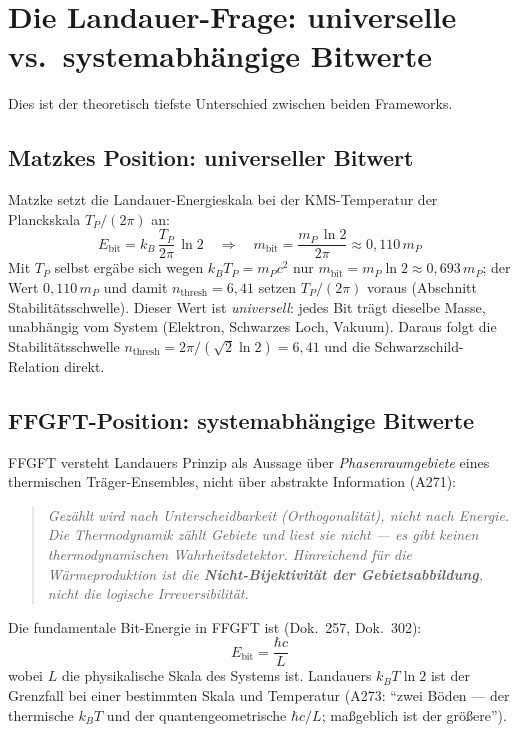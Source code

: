 \section{Die Landauer-Frage: universelle vs.\ systemabhängige Bitwerte}

Dies ist der theoretisch tiefste Unterschied zwischen beiden Frameworks.

\subsection{Matzkes Position: universeller Bitwert}

Matzke setzt die Landauer-Energieskala bei der KMS-Temperatur der Planckskala $T_P/(2\pi)$ an:
\begin{equation}
  E_{\mathrm{bit}} = k_B\,\frac{T_P}{2\pi}\,\ln 2 \quad\Rightarrow\quad
  m_{\mathrm{bit}} = \frac{m_P\,\ln 2}{2\pi} \approx 0{,}110\,m_P
  \tag{Matzke, Kap.\ 6}
\end{equation}
Mit $T_P$ selbst ergäbe sich wegen $k_BT_P = m_Pc^2$ nur
$m_{\mathrm{bit}} = m_P\ln 2 \approx 0{,}693\,m_P$; der Wert $0{,}110\,m_P$ und
damit $n_{\mathrm{thresh}} = 6{,}41$ setzen $T_P/(2\pi)$ voraus (Abschnitt Stabilitätsschwelle).
Dieser Wert ist \emph{universell}: jedes Bit trägt dieselbe Masse,
unabhängig vom System (Elektron, Schwarzes Loch, Vakuum).
Daraus folgt die Stabilitätsschwelle $n_{\mathrm{thresh}} = 2\pi/(\sqrt{2}\ln 2) = 6{,}41$
und die Schwarzschild-Relation direkt.

\subsection{FFGFT-Position: systemabhängige Bitwerte}

FFGFT versteht Landauers Prinzip als Aussage über \emph{Phasenraumgebiete} eines
thermischen Träger-Ensembles, nicht über abstrakte Information (A271):

\begin{quote}
  \itshape
  Gezählt wird nach Unterscheidbarkeit (Orthogonalität), nicht nach Energie.
  Die Thermodynamik zählt Gebiete und liest sie nicht — es gibt keinen
  thermodynamischen Wahrheitsdetektor.
  Hinreichend für die Wärmeproduktion ist die \textbf{Nicht-Bijektivität der
  Gebietsabbildung}, nicht die logische Irreversibilität.
\end{quote}

\medskip
Die fundamentale Bit-Energie in FFGFT ist (Dok.\ 257, Dok.\ 302):
\begin{equation}
  E_{\mathrm{bit}} = \frac{\hbar c}{L}
  \tag{FFGFT, Dok.\ 257}
\end{equation}
wobei $L$ die physikalische Skala des Systems ist.
Landauers $k_B T\ln 2$ ist der Grenzfall bei einer bestimmten Skala und Temperatur
(A273: \enquote{zwei Böden — der thermische $k_BT$ und der quantengeometrische
$\hbar c/L$; maßgeblich ist der größere}).

